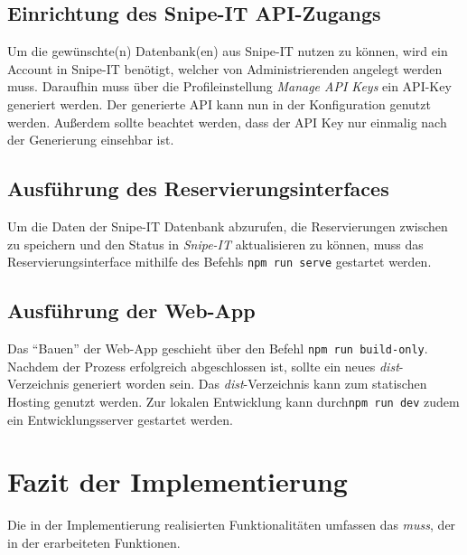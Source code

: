 \subsection{Einrichtung des Snipe-IT API-Zugangs}
\label{section:api}
Um die gewünschte(n) Datenbank(en) aus Snipe-IT nutzen zu können, wird ein Account in Snipe-IT
benötigt, welcher von Administrierenden angelegt werden muss. Daraufhin muss über die
Profileinstellung \textit{Manage API Keys} ein API-Key generiert werden. Der generierte API kann nun
in der Konfiguration genutzt werden. Außerdem sollte beachtet werden, dass der API Key nur einmalig
nach der Generierung einsehbar ist.

\subsection{Ausführung des Reservierungsinterfaces}
Um die Daten der Snipe-IT Datenbank abzurufen, die Reservierungen zwischen zu speichern und den
Status in \textit{Snipe-IT} aktualisieren zu können, muss das Reservierungsinterface mithilfe des
Befehls \lstinline{npm run serve} gestartet werden.


\subsection{Ausführung der Web-App}
Das \enquote{Bauen} der Web-App geschieht über den Befehl \lstinline{npm run build-only}. Nachdem
der Prozess erfolgreich abgeschlossen ist, sollte ein neues \textit{dist}-Verzeichnis generiert
worden sein. Das \textit{dist}-Verzeichnis kann zum statischen Hosting genutzt werden. Zur lokalen
Entwicklung kann durch\lstinline{npm run dev} zudem ein Entwicklungsserver gestartet werden.

\section{Fazit der Implementierung}

Die in der Implementierung realisierten Funktionalitäten umfassen das \textit{muss}, der in der
 erarbeiteten Funktionen.

